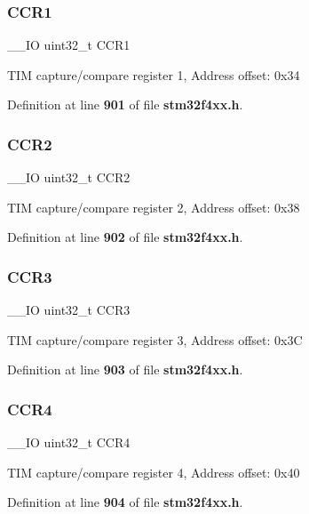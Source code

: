 \subsubsection{C\+C\+R1}
{\footnotesize\ttfamily \+\_\+\+\_\+\+IO uint32\+\_\+t C\+C\+R1}

T\+IM capture/compare register 1, Address offset\+: 0x34 

Definition at line \textbf{ 901} of file \textbf{ stm32f4xx.\+h}.

\mbox{\label{structTIM__TypeDef_ab90aa584f07eeeac364a67f5e05faa93}} 
\subsubsection{C\+C\+R2}
{\footnotesize\ttfamily \+\_\+\+\_\+\+IO uint32\+\_\+t C\+C\+R2}

T\+IM capture/compare register 2, Address offset\+: 0x38 

Definition at line \textbf{ 902} of file \textbf{ stm32f4xx.\+h}.

\mbox{\label{structTIM__TypeDef_a27a478cc47a3dff478555ccb985b06a2}} 
\subsubsection{C\+C\+R3}
{\footnotesize\ttfamily \+\_\+\+\_\+\+IO uint32\+\_\+t C\+C\+R3}

T\+IM capture/compare register 3, Address offset\+: 0x3C 

Definition at line \textbf{ 903} of file \textbf{ stm32f4xx.\+h}.

\mbox{\label{structTIM__TypeDef_a85fdb75569bd7ea26fa48544786535be}} 
\subsubsection{C\+C\+R4}
{\footnotesize\ttfamily \+\_\+\+\_\+\+IO uint32\+\_\+t C\+C\+R4}

T\+IM capture/compare register 4, Address offset\+: 0x40 

Definition at line \textbf{ 904} of file \textbf{ stm32f4xx.\+h}.


